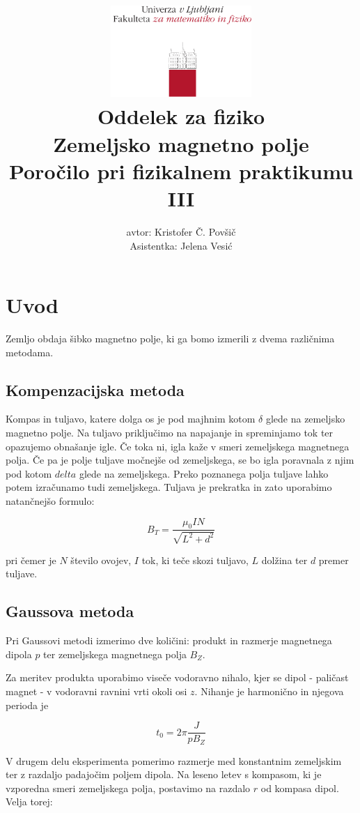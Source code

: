 \documentclass[12pt]{report}
\title{
  \includegraphics[width=0.4\textwidth]{fmf_logo}\\
  {\small Oddelek za fiziko} \\
  {Zemeljsko magnetno polje}\\
  {\small Poročilo pri fizikalnem praktikumu III}\\

}
\date{}
\author{ avtor: Kristofer Č. Povšič \\[5 cm]
 \small  Asistentka: Jelena Vesić
}
\begin{document}
\setcounter{page}{2}

\maketitle

\chapter*{Uvod}

Zemljo obdaja šibko magnetno polje, ki ga bomo izmerili z dvema različnima metodama. 

\section*{Kompenzacijska metoda}

Kompas in tuljavo, katere dolga os je pod majhnim kotom $\delta$ glede na zemeljsko magnetno polje. Na tuljavo priključimo na napajanje in spreminjamo tok ter opazujemo obnašanje igle. Če toka ni, igla kaže v smeri zemeljskega magnetnega polja. Če pa je polje tuljave močnejše od zemeljskega, se bo igla poravnala z njim pod kotom $delta$ glede na zemeljskega. Preko poznanega polja tuljave lahko potem izračunamo tudi zemeljskega. Tuljava je prekratka in zato uporabimo natančnejšo formulo: 

\begin{equation}
  B_T = \frac{\mu_0 I N}{\sqrt{L^2 + d^2}}
\end{equation}

pri čemer je $N$ število ovojev, $I$ tok, ki teče skozi tuljavo, $L$ dolžina ter $d$ premer tuljave. 

\section*{Gaussova metoda}

Pri Gaussovi metodi izmerimo dve količini: produkt in razmerje magnetnega dipola $p$ ter zemeljskega magnetnega polja $B_Z$.

Za meritev produkta uporabimo viseče vodoravno nihalo, kjer se dipol - paličast magnet - v vodoravni ravnini vrti okoli osi $z$. Nihanje je harmonično in njegova perioda je 

\begin{equation}
  t_0 = 2\pi \frac{J}{pB_Z}
\end{equation}

V drugem delu eksperimenta pomerimo razmerje med konstantnim zemeljskim ter z razdaljo padajočim poljem dipola. Na leseno letev s kompasom, ki je vzporedna smeri zemeljskega polja, postavimo na razdalo $r$ od kompasa dipol. Velja torej: 
\end{document}
